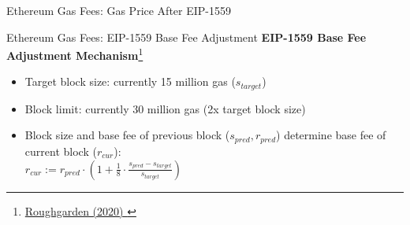 \documentclass[handout]{beamer}
\begin{document}
\begin{frame}{Ethereum Gas Fees: Gas Price After EIP-1559}
	\begin{figure}
		
	\end{figure}
	
	\vspace{-1.25em}
	
	
\end{frame}

\begin{frame}{Ethereum Gas Fees: EIP-1559 Base Fee Adjustment}
	\textbf{EIP-1559 Base Fee Adjustment Mechanism}\footnote{\href{https://timroughgarden.org/papers/eip1559.pdf}{Roughgarden (2020) \link}}
	\begin{itemize}
		\item Target block size: currently 15 million gas ($s_{target}$)
		\item Block limit: currently 30 million gas (2x target block size)
		\item Block size and base fee of previous block ($s_{pred}, r_{pred}$) determine base fee of current block ($r_{cur}$):\\
		\vspace{0.5cm}
		$r_{cur} := r_{pred}\cdot\left(1+\frac{1}{8}\cdot\frac{s_{pred}-s_{target}}{s_{target}}\right)$
	\end{itemize}
\end{frame}
\end{document}
